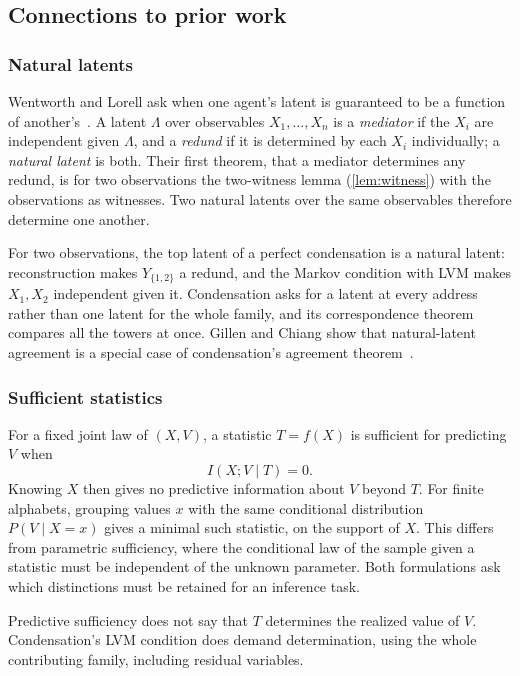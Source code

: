 \documentclass[11pt]{article}
\begin{document}
\subsection{Connections to prior work}
\label{sec:context-connections}
\subsubsection{Natural latents}
Wentworth and Lorell ask when one agent's latent is guaranteed to be a
function of another's~\citep{wentworth2025natural}. A latent $\Lambda$ over
observables $X_1,\ldots,X_n$ is a \emph{mediator} if the $X_i$ are independent
given $\Lambda$, and a \emph{redund} if it is determined by each $X_i$
individually; a \emph{natural latent} is both. Their first theorem, that a
mediator determines any redund, is for two observations the two-witness lemma
(\cref{lem:witness}) with the observations as witnesses. Two natural latents
over the same observables therefore determine one another.

For two observations, the top latent of a perfect condensation is a natural
latent: reconstruction makes $Y_{\{1,2\}}$ a redund, and the Markov condition
with LVM makes $X_1,X_2$ independent given it. Condensation asks for a latent
at every address rather than one latent for the whole family, and its
correspondence theorem compares all the towers at once. Gillen and Chiang show
that natural-latent agreement is a special case of condensation's agreement
theorem~\citep{gillen2026summary}.

\subsubsection{Sufficient statistics}
For a fixed joint law of $(X,V)$, a statistic $T=f(X)$ is sufficient for predicting
$V$ when
\[
 I(X;V\mid T)=0.
\]
Knowing $X$ then gives no predictive information about $V$ beyond $T$.
For finite alphabets, grouping values $x$ with the same conditional distribution
$P(V\mid X=x)$ gives a minimal such statistic, on the support of $X$.
This differs from parametric sufficiency, where the conditional law of
the sample given a statistic must be independent of the unknown parameter.
Both formulations ask which distinctions must be retained for an inference task.

Predictive sufficiency does not say that $T$ determines the realized value of
$V$. Condensation's LVM condition does demand determination, using the whole
contributing family, including residual variables.
\end{document}
